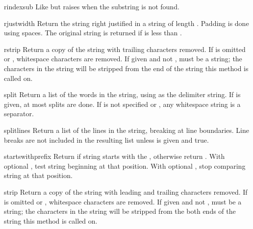\begin{methoddesc}[string]{rindex}{sub}
Like  but raises  when the
substring  is not found.
\end{methoddesc}

\begin{methoddesc}[string]{rjust}{width}
Return the string right justified in a string of length .
Padding is done using spaces.  The original string is returned if
 is less than .
\end{methoddesc}

\begin{methoddesc}[string]{rstrip}{}
Return a copy of the string with trailing characters removed.  If
 is omitted or , whitespace characters are
removed.  If given and not ,  must be a string;
the characters in the string will be stripped from the end of the
string this method is called on.
\end{methoddesc}

\begin{methoddesc}[string]{split}{}
Return a list of the words in the string, using  as the
delimiter string.  If  is given, at most 
splits are done.  If  is not specified or , any
whitespace string is a separator.
\end{methoddesc}

\begin{methoddesc}[string]{splitlines}{}
Return a list of the lines in the string, breaking at line
boundaries.  Line breaks are not included in the resulting list unless
 is given and true.
\end{methoddesc}

\begin{methoddesc}[string]{startswith}{prefix}
Return  if string starts with the , otherwise
return .  With optional , test string beginning at
that position.  With optional , stop comparing string at that
position.
\end{methoddesc}

\begin{methoddesc}[string]{strip}{}
Return a copy of the string with leading and trailing characters
removed.  If  is omitted or , whitespace
characters are removed.  If given and not , 
must be a string; the characters in the string will be stripped from
the both ends of the string this method is called on.
\end{methoddesc}

